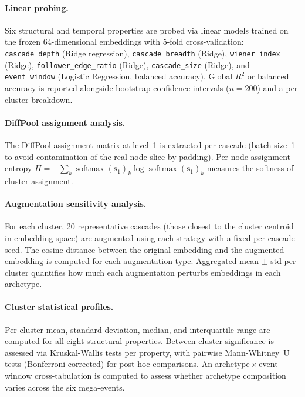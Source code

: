 \documentclass[12pt, a4paper]{article}
\begin{document}
\paragraph{Linear probing.} Six structural and temporal properties are probed via linear models trained on the frozen 64-dimensional embeddings with 5-fold cross-validation: \texttt{cascade\_depth} (Ridge regression), \texttt{cascade\_breadth} (Ridge), \texttt{wiener\_index} (Ridge), \texttt{follower\_edge\_ratio} (Ridge), \texttt{cascade\_size} (Ridge), and \texttt{event\_window} (Logistic Regression, balanced accuracy). Global $R^2$ or balanced accuracy is reported alongside bootstrap confidence intervals ($n\!=\!200$) and a per-cluster breakdown.

\paragraph{DiffPool assignment analysis.} The DiffPool assignment matrix at level~1 is extracted per cascade (batch size~1 to avoid contamination of the real-node slice by padding). Per-node assignment entropy $H = -\sum_k \operatorname{softmax}(\mathbf{s}_1)_k \log \operatorname{softmax}(\mathbf{s}_1)_k$ measures the softness of cluster assignment.

\paragraph{Augmentation sensitivity analysis.} For each cluster, 20 representative cascades (those closest to the cluster centroid in embedding space) are augmented using each strategy with a fixed per-cascade seed. The cosine distance between the original embedding and the augmented embedding is computed for each augmentation type. Aggregated mean $\pm$ std per cluster quantifies how much each augmentation perturbs embeddings in each archetype.

\paragraph{Cluster statistical profiles.} Per-cluster mean, standard deviation, median, and interquartile range are computed for all eight structural properties. Between-cluster significance is assessed via Kruskal-Wallis tests per property, with pairwise Mann-Whitney~U tests (Bonferroni-corrected) for post-hoc comparisons. An archetype\,$\times$\,event-window cross-tabulation is computed to assess whether archetype composition varies across the six mega-events.
\end{document}

